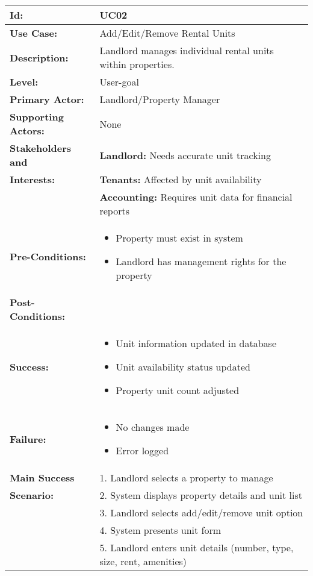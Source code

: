 \documentclass[12pt]{article}
\begin{document}
\begin{tabular}{|p{3cm}|p{11cm}|}
\hline
\textbf{Id:} & UC02 \\
\hline
\textbf{Use Case:} & Add/Edit/Remove Rental Units \\
\hline
\textbf{Description:} & Landlord manages individual rental units within properties. \\
\hline
\textbf{Level:} & User-goal \\
\hline
\textbf{Primary Actor:} & Landlord/Property Manager \\
\hline
\textbf{Supporting Actors:} & None \\
\hline
\textbf{Stakeholders and} & \textbf{Landlord:} Needs accurate unit tracking \\
\textbf{Interests:} & \textbf{Tenants:} Affected by unit availability \\
& \textbf{Accounting:} Requires unit data for financial reports \\
\hline
\textbf{Pre-Conditions:} & 
\begin{itemize}
    \item Property must exist in system
    \item Landlord has management rights for the property
\end{itemize} \\
\hline
\textbf{Post-Conditions:} & \\
\textbf{Success:} & 
\begin{itemize}
    \item Unit information updated in database
    \item Unit availability status updated
    \item Property unit count adjusted
\end{itemize} \\
\textbf{Failure:} & 
\begin{itemize}
    \item No changes made
    \item Error logged
\end{itemize} \\
\hline
\textbf{Main Success} & 1. Landlord selects a property to manage \\
\textbf{Scenario:} & 2. System displays property details and unit list \\
& 3. Landlord selects add/edit/remove unit option \\
& 4. System presents unit form \\
& 5. Landlord enters unit details (number, type, size, rent, amenities) \\

\end{tabular}
\end{document}
